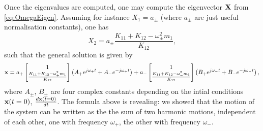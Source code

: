 \documentclass[11pt,twoside,a4paper,english]{book}
\begin{document}
Once the eigenvalues are computed, one may compute the eigenvector $ {\bf X}$ from \eqref{eq:OmegaEigen}. Assuming for instance $ { X}_1 = a_{\pm}$ (where $a_\pm$ are just useful normalisation constants), one has
\begin{equation}
 X_2 = a_{\pm}\frac{K_{11} + K_{12} - \omega^2_\pm m_1}{K_{12}},
\end{equation}
such that the general solution is given by
\begin{equation}
{\bf x} = a_+\begin{bmatrix} 1 \\ \frac{K_{11} + K_{12} - \omega^2_+ m_1}{K_{12}}\end{bmatrix}\left(A_+ e^{j\omega_+ t} + A_- e^{- j\omega_+ t} \right) + a_-\begin{bmatrix} 1 \\ \frac{K_{11} + K_{12} - \omega^2_- m_1}{K_{12}}\end{bmatrix}\left(B_+ e^{j\omega_- t} + B_- e^{- j\omega_- t} \right),
\end{equation}
where $A_\pm$, $B_\pm$ are four complex constants depending on the intial conditions ${\bf x}(t=0)$, $\frac{d{\bf x}(t=0) }{dt}$. The formula above is revealing: we showed that the motion of the system can be written as the the sum of two harmonic motions, independent of each other, one with frequency $\omega_+$, the other with frequency $\omega_-$. 
\end{document}
